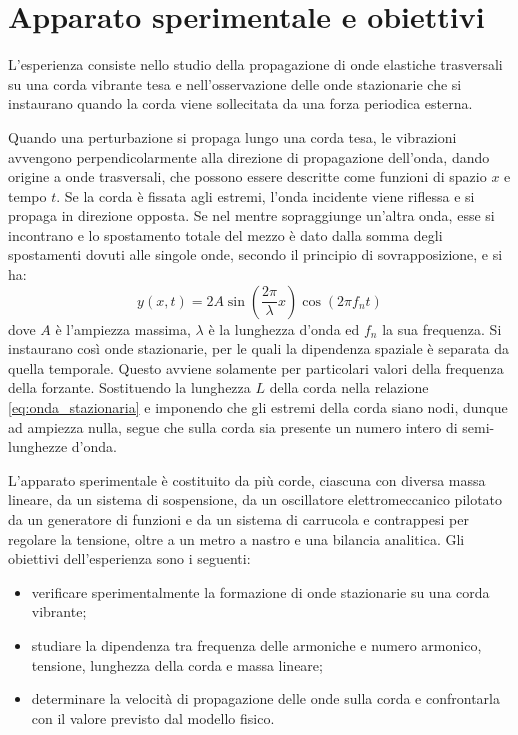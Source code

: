 \section{Apparato sperimentale e obiettivi}
L'esperienza consiste nello studio della propagazione di onde elastiche trasversali su una corda vibrante tesa e nell'osservazione delle onde stazionarie che si instaurano quando la corda viene sollecitata da una forza periodica esterna. 

Quando una perturbazione si propaga lungo una corda tesa, le vibrazioni avvengono perpendicolarmente alla direzione di propagazione dell'onda, dando origine a onde trasversali, che possono essere descritte come funzioni di spazio $x$ e tempo $t$. Se la corda è fissata agli estremi, l'onda incidente viene riflessa e si propaga in direzione opposta. Se nel mentre sopraggiunge un'altra onda, esse si incontrano e lo spostamento totale del mezzo è dato dalla somma degli spostamenti dovuti alle singole onde, secondo il principio di sovrapposizione, e si ha:
\begin{equation}
    y(x,t) = 2A \sin\left(\frac{2\pi }{\lambda}x\right) \cos(2\pi f_n t)
    \label{eq:onda_stazionaria}
\end{equation}
dove $A$ è l'ampiezza massima, $\lambda$ è la lunghezza d'onda ed $f_n$ la sua frequenza. Si instaurano così onde stazionarie, per le quali la dipendenza spaziale è separata da quella temporale. Questo avviene solamente per particolari valori della frequenza della forzante. Sostituendo la lunghezza $L$ della corda nella relazione \eqref{eq:onda_stazionaria} e imponendo che gli estremi della corda siano nodi, dunque ad ampiezza nulla, segue che sulla corda sia presente un numero intero di semi-lunghezze d'onda.

L'apparato sperimentale è costituito da più corde, ciascuna con diversa massa lineare, da un sistema di sospensione, da un oscillatore elettromeccanico pilotato da un generatore di funzioni e da un sistema di carrucola e contrappesi per regolare la tensione, oltre a un metro a nastro e una bilancia analitica.
Gli obiettivi dell'esperienza sono i seguenti:

\begin{itemize}
    \item verificare sperimentalmente la formazione di onde stazionarie su una corda vibrante;
    \item studiare la dipendenza tra frequenza delle armoniche e numero armonico, tensione, lunghezza della corda e massa lineare;
    \item determinare la velocità di propagazione delle onde sulla corda e confrontarla con il valore previsto dal modello fisico.
\end{itemize}
\newpage